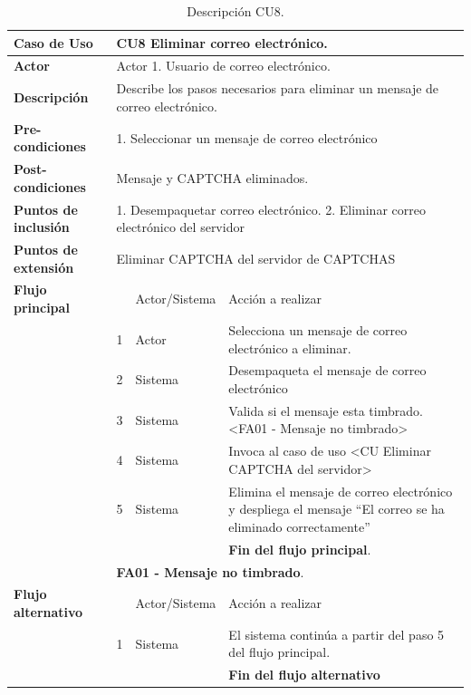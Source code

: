 \begin{table}[H]
 \centering
   {
     \begin{tabular}{| p{} | p{} |p{4cm}|p{5cm}|}
     \hline
     \textbf{Caso de Uso} &\multicolumn{3}{|l|}{CU8 Eliminar correo electrónico.}\\
     \hline
     \textbf{Actor} & \multicolumn{3}{|l|}{Actor 1. Usuario de correo electrónico.}\\
     \hline
     \textbf{Descripción} & \multicolumn{3}{|p{10cm}|}{Describe los pasos necesarios para eliminar un mensaje de correo electrónico.}\\
     \hline
     \textbf{Pre-condiciones} & \multicolumn{3}{|l|}{1. Seleccionar un mensaje de correo electrónico}\\
     \hline
     \textbf{Post-condiciones} & \multicolumn{3}{|l|}{Mensaje y CAPTCHA eliminados.}\\
     \hline
     \textbf{Puntos de inclusión} & \multicolumn{3}{|p{10cm}|}{1. Desempaquetar correo electrónico. 2. Eliminar correo electrónico del servidor}\\
     \hline
     \textbf{Puntos de extensión} & \multicolumn{3}{|l|}{Eliminar CAPTCHA del servidor de CAPTCHAS}\\
     \hline
     \textbf{Flujo principal} & & Actor/Sistema & Acción a realizar\\
     \hline
     & 1 & Actor & Selecciona un mensaje de correo electrónico a eliminar.\\
     \hline
     & 2 & Sistema & Desempaqueta el mensaje de correo electrónico\\
     \hline
     & 3 & Sistema & Valida si el mensaje esta timbrado. <FA01 - Mensaje no timbrado>\\
     \hline
     & 4 & Sistema & Invoca al caso de uso <CU Eliminar CAPTCHA del servidor>\\
     \hline
     & 5 & Sistema & Elimina el mensaje de correo electrónico y despliega el mensaje ``El correo se ha eliminado correctamente''\\
     \hline
     & & & \textbf{Fin del flujo principal}.\\
     \hline
     & \multicolumn{3}{|l|}{\textbf{FA01 - Mensaje no timbrado}.}\\
     \hline
     \textbf{Flujo alternativo} & & Actor/Sistema & Acción a realizar\\
     \hline
     & 1 & Sistema & El sistema continúa a partir del paso 5 del flujo principal.\\
     \hline
     &  & & \textbf{Fin del flujo alternativo}\\
     
     \end{tabular}
    }
    \caption{Descripción CU8.}
    \label{tabla:CU8}
\end{table}


